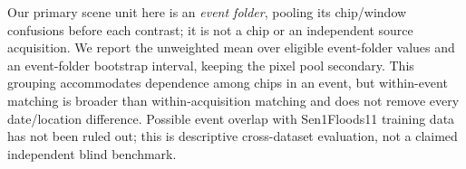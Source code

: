 Our primary scene unit here is an \emph{event folder}, pooling its chip/window confusions before each contrast; it is not a chip or an independent source acquisition.
We report the unweighted mean over eligible event-folder values and an event-folder bootstrap interval, keeping the pixel pool secondary.
This grouping accommodates dependence among chips in an event, but within-event matching is broader than within-acquisition matching and does not remove every date/location difference.
Possible event overlap with Sen1Floods11 training data has not been ruled out; this is descriptive cross-dataset evaluation, not a claimed independent blind benchmark.


